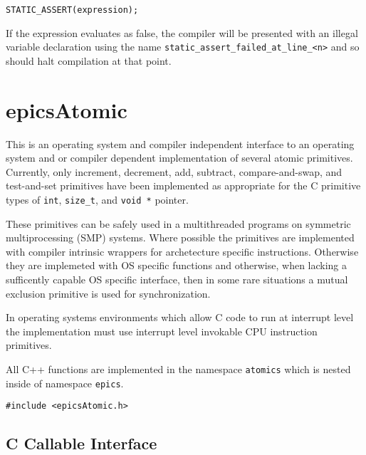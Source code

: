 \begin{verbatim}
STATIC_ASSERT(expression);
\end{verbatim}

If the expression evaluates as false, the compiler will be presented with an illegal variable declaration using the name \verb|static_assert_failed_at_line_<n>| and so should halt compilation at that point.

\section{epicsAtomic}

This is an operating system and compiler independent interface to an operating system and or compiler dependent implementation of several atomic primitives.
Currently, only increment, decrement, add, subtract, compare-and-swap, and test-and-set primitives have been implemented as appropriate for the C primitive types of \verb|int|, \verb|size_t|, and \verb|void *| pointer.

These primitives can be safely used in a multithreaded programs on symmetric multiprocessing (SMP) systems.
Where possible the primitives are implemented with compiler intrinsic wrappers for archetecture specific instructions.
Otherwise they are implemeted with OS specific functions and otherwise, when lacking a sufficently capable OS specific interface, then in some rare situations a mutual exclusion primitive is used for synchronization.

In operating systems environments which allow C code to run at interrupt level the implementation must use interrupt level invokable CPU instruction primitives.

All C++ functions are implemented in the namespace \verb|atomics| which is nested inside of namespace \verb|epics|.

\begin{verbatim}
#include <epicsAtomic.h>
\end{verbatim}

\subsection{C Callable Interface}

